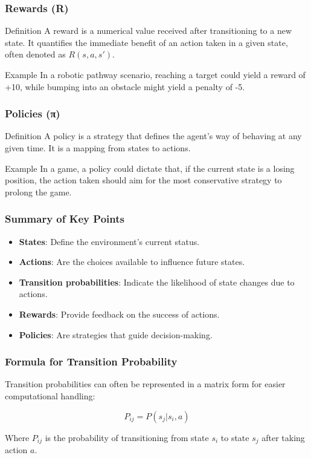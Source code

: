 \documentclass[aspectratio=169]{beamer}
\begin{document}
\begin{frame}[fragile]
    \frametitle{Rewards (R)}
    \begin{block}{Definition}
        A reward is a numerical value received after transitioning to a new state. It quantifies the immediate benefit of an action taken in a given state, often denoted as \( R(s, a, s') \).
    \end{block}
    \begin{block}{Example}
        In a robotic pathway scenario, reaching a target could yield a reward of +10, while bumping into an obstacle might yield a penalty of -5.
    \end{block}
\end{frame}

\begin{frame}[fragile]
    \frametitle{Policies (π)}
    \begin{block}{Definition}
        A policy is a strategy that defines the agent's way of behaving at any given time. It is a mapping from states to actions.
    \end{block}
    \begin{block}{Example}
        In a game, a policy could dictate that, if the current state is a losing position, the action taken should aim for the most conservative strategy to prolong the game.
    \end{block}
\end{frame}

\begin{frame}[fragile]
    \frametitle{Summary of Key Points}
    \begin{itemize}
        \item \textbf{States}: Define the environment’s current status.
        \item \textbf{Actions}: Are the choices available to influence future states.
        \item \textbf{Transition probabilities}: Indicate the likelihood of state changes due to actions.
        \item \textbf{Rewards}: Provide feedback on the success of actions.
        \item \textbf{Policies}: Are strategies that guide decision-making.
    \end{itemize}
\end{frame}

\begin{frame}[fragile]
    \frametitle{Formula for Transition Probability}
    Transition probabilities can often be represented in a matrix form for easier computational handling:
    
    \begin{equation}
        P_{ij} = P(s_j | s_i, a)
    \end{equation}
    
    Where \( P_{ij} \) is the probability of transitioning from state \( s_i \) to state \( s_j \) after taking action \( a \).
\end{frame}
\end{document}
